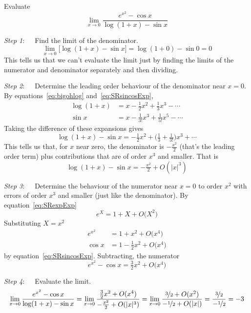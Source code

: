 \begin{eg}\label{eg:bigohlimitD}
Evaluate
\begin{equation*}
\lim_{x\rightarrow 0}\frac{e^{x^2}-\cos x}{\log(1+x)-\sin x}
\end{equation*}
\soln

\noindent \emph{Step 1}:\ \ \ Find the limit of the denominator.
\begin{equation*}
\lim_{x\rightarrow 0}\big[\log(1+x)-\sin x\big]
=\log(1+0)-\sin 0
=0
\end{equation*}
This tells us that we can't evaluate the limit just by
finding the limits of the numerator and denominator separately
and then dividing.

\noindent \emph{Step 2}:\ \ \ Determine the leading order behaviour of
the denominator near $x=0$. By equations~\eqref{eq:bigohlog}
and~\eqref{eq:SRsincosExp},
\begin{align*}
\log(1+x) & = x-\tfrac{1}{2}x^2+\tfrac{1}{3}x^3-\cdots \\
\sin x & = x-\tfrac{1}{3!}x^3+\tfrac{1}{5!}x^5-\cdots
\end{align*}
Taking the difference of these expansions gives
\begin{equation*}
\log(1+x)-\sin x = -\tfrac{1}{2}x^2+\big(\tfrac{1}{3}
                                 +\tfrac{1}{3!}\big)x^3 +\cdots
\end{equation*}
This tells us that, for $x$ near zero, the denominator is
$-\tfrac{x^2}{2}$ (that's the leading order term) plus contributions
that are of order $x^3$ and smaller. That is
\begin{equation*}
\log(1+x)-\sin x = -\tfrac{x^2}{2}+ O(|x|^3)
\end{equation*}

\noindent \emph{Step 3}:\ \ \ Determine the behaviour of
the numerator near $x=0$ to order $x^2$ with errors of order $x^3$ and
smaller (just like the denominator).
By equation~\eqref{eq:SRexpExp}
\begin{equation*}
e^X=1+X+O\big(X^2\big)
\end{equation*}
Substituting $X=x^2$
\begin{align*}
e^{x^2} & = 1+x^2 +O\big(x^4\big) \\
\cos x & = 1-\tfrac{1}{2}x^2+O\big(x^4\big)
\end{align*}
by equation~\eqref{eq:SRsincosExp}.
Subtracting, the numerator
\begin{equation*}
e^{x^2}-\cos x = \tfrac{3}{2}x^2+O\big(x^4\big)
\end{equation*}

\noindent \emph{Step 4}:\ \ \ Evaluate the limit.
\begin{align*}
\lim_{x\rightarrow 0}\frac{e^{x^2}-\cos x}{\log(1+x)-\sin x}
=\lim_{x\rightarrow 0}\frac{\frac{3}{2}x^2+O(x^4)}
                               {-\frac{x^2}{2}+ O(|x|^3)}
=\lim_{x\rightarrow 0}\frac{\nicefrac{3}{2}+O(x^2)}
                               {-\nicefrac{1}{2}+ O(|x|)}
=\frac{\nicefrac{3}{2}} {-\nicefrac{1}{2}}
=-3
\end{align*}
\end{eg}

